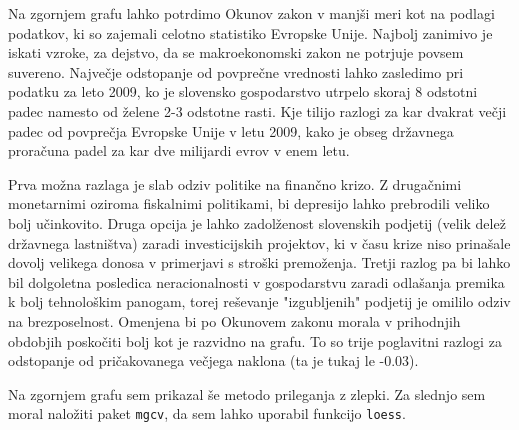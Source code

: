 \documentclass[11pt,a4paper]{article}
\begin{document}
Na zgornjem grafu lahko potrdimo Okunov zakon v manjši meri kot na podlagi podatkov, ki so zajemali celotno statistiko Evropske Unije. Najbolj zanimivo je iskati vzroke, za dejstvo, da se makroekonomski zakon ne potrjuje povsem suvereno. Največje odstopanje od povprečne vrednosti lahko zasledimo pri podatku za leto 2009, ko je slovensko gospodarstvo utrpelo skoraj 8 odstotni padec namesto od želene 2-3 odstotne rasti. Kje tilijo razlogi za kar dvakrat večji padec od povprečja Evropske Unije v letu 2009, kako je obseg državnega proračuna padel za kar dve milijardi evrov v enem letu.

Prva možna razlaga je slab odziv politike na finančno krizo. Z drugačnimi monetarnimi oziroma fiskalnimi politikami, bi depresijo lahko prebrodili veliko bolj učinkovito. Druga opcija je lahko zadolženost slovenskih podjetij (velik delež državnega lastništva) zaradi investicijskih projektov, ki v času krize niso prinašale dovolj velikega donosa v primerjavi s stroški premoženja. Tretji razlog pa bi lahko bil dolgoletna posledica neracionalnosti v gospodarstvu zaradi odlašanja premika k bolj tehnološkim panogam, torej reševanje "izgubljenih" podjetij je omililo odziv na brezposelnost. Omenjena bi po Okunovem zakonu morala v prihodnjih obdobjih poskočiti bolj kot je razvidno na grafu. To so trije poglavitni razlogi za odstopanje od pričakovanega večjega naklona (ta je tukaj le -0.03).


Na zgornjem grafu sem prikazal še metodo prileganja z zlepki. Za slednjo sem moral naložiti paket \verb|mgcv|, da sem lahko uporabil funkcijo \verb|loess|.
\end{document}
